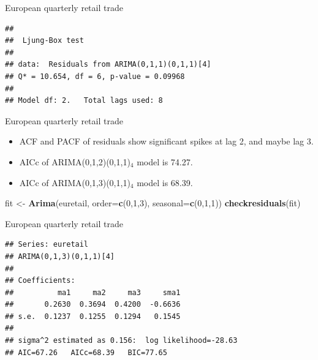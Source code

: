 \documentclass[14pt,ignorenonframetext,]{beamer}
\newenvironment{Shaded}{\begin{snugshade}}{\end{snugshade}}
\newcommand{\KeywordTok}[1]{\textcolor[rgb]{0.13,0.29,0.53}{\textbf{#1}}}
\newcommand{\DataTypeTok}[1]{\textcolor[rgb]{0.13,0.29,0.53}{#1}}
\newcommand{\DecValTok}[1]{\textcolor[rgb]{0.00,0.00,0.81}{#1}}
\newcommand{\StringTok}[1]{\textcolor[rgb]{0.31,0.60,0.02}{#1}}
\newcommand{\NormalTok}[1]{#1}
\providecommand{\tightlist}{%
  \setlength{\itemsep}{0pt}\setlength{\parskip}{0pt}}
\begin{document}
\begin{frame}[fragile]{European quarterly retail trade}

\fontsize{13}{14}\sf

\begin{verbatim}
## 
##  Ljung-Box test
## 
## data:  Residuals from ARIMA(0,1,1)(0,1,1)[4]
## Q* = 10.654, df = 6, p-value = 0.09968
## 
## Model df: 2.   Total lags used: 8
\end{verbatim}

\end{frame}

\begin{frame}[fragile]{European quarterly retail trade}

\begin{itemize}
\tightlist
\item
  ACF and PACF of residuals show significant spikes at lag 2, and maybe
  lag 3.
\item
  AICc of ARIMA(0,1,2)(0,1,1)\(_4\) model is 74.27.
\item
  AICc of ARIMA(0,1,3)(0,1,1)\(_4\) model is 68.39. \pause\vfill
\end{itemize}

\begin{Shaded}
\begin{Highlighting}[]
\NormalTok{fit <-}\StringTok{ }\KeywordTok{Arima}\NormalTok{(euretail, }\DataTypeTok{order=}\KeywordTok{c}\NormalTok{(}\DecValTok{0}\NormalTok{,}\DecValTok{1}\NormalTok{,}\DecValTok{3}\NormalTok{),}
  \DataTypeTok{seasonal=}\KeywordTok{c}\NormalTok{(}\DecValTok{0}\NormalTok{,}\DecValTok{1}\NormalTok{,}\DecValTok{1}\NormalTok{))}
\KeywordTok{checkresiduals}\NormalTok{(fit)}
\end{Highlighting}
\end{Shaded}

\end{frame}

\begin{frame}[fragile]{European quarterly retail trade}

\fontsize{12}{15}\sf

\begin{verbatim}
## Series: euretail 
## ARIMA(0,1,3)(0,1,1)[4] 
## 
## Coefficients:
##          ma1     ma2     ma3     sma1
##       0.2630  0.3694  0.4200  -0.6636
## s.e.  0.1237  0.1255  0.1294   0.1545
## 
## sigma^2 estimated as 0.156:  log likelihood=-28.63
## AIC=67.26   AICc=68.39   BIC=77.65
\end{verbatim}

\end{frame}
\end{document}
